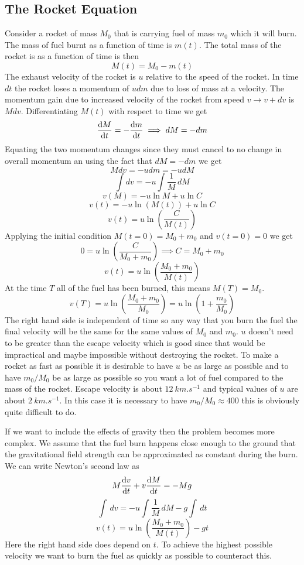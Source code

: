 \documentclass{article}
\begin{document}
    \subsection{The Rocket Equation}
    Consider a rocket of mass \(M_0\) that is carrying fuel of mass \(m_0\) which it will burn.
    The mass of fuel burnt as a function of time is \(m(t)\).
    The total mass of the rocket is as a function of time is then
    \[M(t) = M_0 - m(t)\]
    The exhaust velocity of the rocket is \(u\) relative to the speed of the rocket.
    In time \(dt\) the rocket loses a momentum of \(udm\) due to loss of mass at a velocity.
    The momentum gain due to increased velocity of the rocket from speed \(v\to v + dv\) is \(Mdv\).
    Differentiating \(M(t)\) with respect to time we get
    \[\dv{M}{t} = -\dv{m}{t} \implies dM = -dm\]
    Equating the two momentum changes since they must cancel to no change in overall momentum an using the fact that \(dM = -dm\) we get
    \[Mdv = -udm = -udM\]
    \[\int dv = -u\int\frac{1}{M}\,dM\]
    \[v(M) = -u\ln M + u\ln C\]
    \[v(t) = -u\ln(M(t)) + u\ln C\]
    \[v(t) = u\ln\left(\frac{C}{M(t)}\right)\]
    Applying the initial condition \(M(t=0) = M_0 + m_0\) and \(v(t=0) = 0\) we get
    \[0 = u\ln\left(\frac{C}{M_0 + m_0}\right)\implies C = M_0 + m_0\]
    \[v(t) = u\ln\left(\frac{M_0 + m_0}{M(t)}\right)\]
    At the time \(T\) all of the fuel has been burned, this means \(M(T) = M_0\).
    \[v(T) = u\ln\left(\frac{M_0 + m_0}{M_0}\right) = u\ln\left(1 + \frac{m_0}{M_0}\right)\]
    The right hand side is independent of time so any way that you burn the fuel the final velocity will be the same for the same values of \(M_0\) and \(m_0\).
    \(u\) doesn't need to be greater than the escape velocity which is good since that would be impractical and maybe impossible without destroying the rocket.
    To make a rocket as fast as possible it is desirable to have \(u\) be as large as possible and to have \(m_0/M_0\) be as large as possible so you want a lot of fuel compared to the mass of the rocket.
    Escape velocity is about \(\SI{12}{km.s^{-1}}\) and typical values of \(u\) are about \(\SI{2}{km.s^{-1}}\).
    In this case it is necessary to have \(m_0/M_0\approx400\) this is obviously quite difficult to do.
    
    If we want to include the effects of gravity then the problem becomes more complex.
    We assume that the fuel burn happens close enough to the ground that the gravitational field strength can be approximated as constant during the burn.
    We can write Newton's second law as
    \[M\dv{v}{t} + v\dv{M}{t} = -Mg\]
    \[\int\, dv = -u\int\frac{1}{M}\,dM - g\int\,dt\]
    \[v(t) = u\ln\left(\frac{M_0 + m_0}{M(t)}\right) - gt\]
    Here the right hand side does depend on \(t\).
    To achieve the highest possible velocity we want to burn the fuel as quickly as possible to counteract this.
    
\end{document}
